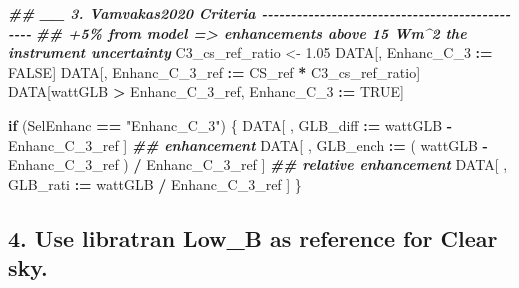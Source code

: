 \documentclass[
  10pt,
  a4paper,oneside]{article}
\newenvironment{Shaded}{\begin{snugshade}}{\end{snugshade}}
\newcommand{\ConstantTok}[1]{\textcolor[rgb]{0.56,0.35,0.01}{#1}}
\newcommand{\ControlFlowTok}[1]{\textcolor[rgb]{0.13,0.29,0.53}{\textbf{#1}}}
\newcommand{\DocumentationTok}[1]{\textcolor[rgb]{0.56,0.35,0.01}{\textbf{\textit{#1}}}}
\newcommand{\FloatTok}[1]{\textcolor[rgb]{0.00,0.00,0.81}{#1}}
\newcommand{\NormalTok}[1]{#1}
\newcommand{\OtherTok}[1]{\textcolor[rgb]{0.56,0.35,0.01}{#1}}
\newcommand{\SpecialCharTok}[1]{\textcolor[rgb]{0.81,0.36,0.00}{\textbf{#1}}}
\newcommand{\StringTok}[1]{\textcolor[rgb]{0.31,0.60,0.02}{#1}}
\begin{document}
\begin{Shaded}
\begin{Highlighting}[]
\DocumentationTok{\#\# \_\_ 3. Vamvakas2020  Criteria  {-}{-}{-}{-}{-}{-}{-}{-}{-}{-}{-}{-}{-}{-}{-}{-}{-}{-}{-}{-}{-}{-}{-}{-}{-}{-}{-}{-}{-}{-}{-}{-}{-}{-}{-}{-}{-}{-}{-}{-}{-}{-}{-}{-}{-}{-}{-}}
\DocumentationTok{\#\# +5\% from model =\textgreater{} enhancements above 15 Wm\^{}2 the instrument uncertainty}
\NormalTok{C3\_cs\_ref\_ratio }\OtherTok{\textless{}{-}} \FloatTok{1.05}
\NormalTok{DATA[, Enhanc\_C\_3 }\SpecialCharTok{:=} \ConstantTok{FALSE}\NormalTok{]}
\NormalTok{DATA[, Enhanc\_C\_3\_ref }\SpecialCharTok{:=}\NormalTok{ CS\_ref }\SpecialCharTok{*}\NormalTok{ C3\_cs\_ref\_ratio]}
\NormalTok{DATA[wattGLB }\SpecialCharTok{\textgreater{}}\NormalTok{ Enhanc\_C\_3\_ref,}
\NormalTok{     Enhanc\_C\_3 }\SpecialCharTok{:=} \ConstantTok{TRUE}\NormalTok{]}

\ControlFlowTok{if}\NormalTok{ (SelEnhanc }\SpecialCharTok{==} \StringTok{"Enhanc\_C\_3"}\NormalTok{) \{}
\NormalTok{    DATA[ , GLB\_diff }\SpecialCharTok{:=}\NormalTok{   wattGLB }\SpecialCharTok{{-}}\NormalTok{ Enhanc\_C\_3\_ref                    ] }\DocumentationTok{\#\# enhancement}
\NormalTok{    DATA[ , GLB\_ench }\SpecialCharTok{:=}\NormalTok{ ( wattGLB }\SpecialCharTok{{-}}\NormalTok{ Enhanc\_C\_3\_ref ) }\SpecialCharTok{/}\NormalTok{ Enhanc\_C\_3\_ref ] }\DocumentationTok{\#\# relative enhancement}
\NormalTok{    DATA[ , GLB\_rati }\SpecialCharTok{:=}\NormalTok{   wattGLB }\SpecialCharTok{/}\NormalTok{ Enhanc\_C\_3\_ref                    ]}
\NormalTok{\}}
\end{Highlighting}
\end{Shaded}

\hypertarget{use-libratran-low_b-as-reference-for-clear-sky.}{%
\subsection{\texorpdfstring{4. Use libratran \textbf{Low\_B} as reference for Clear sky.}{4. Use libratran Low\_B as reference for Clear sky.}}\label{use-libratran-low_b-as-reference-for-clear-sky.}}
\end{document}
